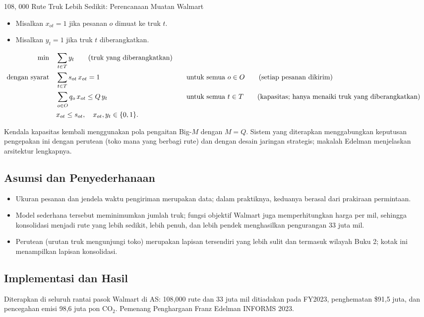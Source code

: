 \begin{casestudybox}{108{,}
\label{case:walmart-loads}000 Rute Truk Lebih Sedikit: Perencanaan Muatan Walmart}
\begin{itemize}
\item Misalkan $x_{ot} = 1$ jika pesanan $o$ dimuat ke truk $t$.
\item Misalkan $y_t = 1$ jika truk $t$ diberangkatkan.
\end{itemize}

\begin{align*}
\min \quad & \sum_{t \in T} y_t   \tag{truk yang diberangkatkan} \\
\mbox{dengan syarat}\quad        & \sum_{t \in T} s_{ot}\, x_{ot} = 1 &&\quad \mbox{untuk semua } o \in O   \tag{setiap pesanan dikirim} \\
           & \sum_{o \in O} q_o\, x_{ot} \leq Q\, y_t &&\quad \mbox{untuk semua } t \in T   \tag{kapasitas; hanya menaiki truk yang diberangkatkan} \\
           & x_{ot} \leq s_{ot}, \quad x_{ot}, y_t \in \{0,1\}.
\end{align*}

Kendala kapasitas kembali menggunakan pola pengaitan Big-$M$ dengan $M = Q$. Sistem yang diterapkan menggabungkan keputusan pengepakan ini dengan perutean (toko mana yang berbagi rute) dan dengan desain jaringan strategis; makalah Edelman menjelaskan arsitektur lengkapnya.

\subsection*{Asumsi dan Penyederhanaan}
\begin{itemize}
\item Ukuran pesanan dan jendela waktu pengiriman merupakan data; dalam praktiknya, keduanya berasal dari prakiraan permintaan.
\item Model sederhana tersebut meminimumkan jumlah truk; fungsi objektif Walmart juga memperhitungkan harga per mil, sehingga konsolidasi menjadi rute yang lebih sedikit, lebih penuh, dan lebih pendek menghasilkan pengurangan 33 juta mil.
\item Perutean (urutan truk mengunjungi toko) merupakan lapisan tersendiri yang lebih sulit dan termasuk wilayah Buku 2; kotak ini menampilkan lapisan konsolidasi.
\end{itemize}

\subsection*{Implementasi dan Hasil}
Diterapkan di seluruh rantai pasok Walmart di AS: 108{,}000 rute dan 33 juta mil ditiadakan pada FY2023, penghematan \$91,5 juta, dan pencegahan emisi 98,6 juta pon CO$_2$. Pemenang Penghargaan Franz Edelman INFORMS 2023.


\end{casestudybox}
